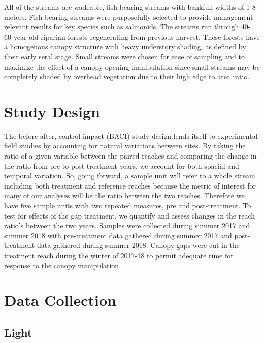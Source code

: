 \documentclass[double,12pt]{beavtex}
\begin{document}
  All of the streams are wadeable, fish-bearing streams with bankfull
  widths of 1-8 meters. Fish-bearing streams were purposefully selected to
  provide management-relevant results for key species such as salmonids.
  The streams run through 40-60-year-old riparian forests regenerating
  from previous harvest. These forests have a homogenous canopy structure
  with heavy understory shading, as defined by their early seral stage.
  Small streams were chosen for ease of sampling and to maximize the
  effect of a canopy opening manipulation since small streams may be
  completely shaded by overhead vegetation due to their high edge to area
  ratio.
  
  \section*{Study Design}\label{study-design}
  
  The before-after, control-impact (BACI) study design lends itself to
  experimental field studies by accounting for natural variations between
  sites. By taking the ratio of a given variable between the paired
  reaches and comparing the change in the ratio from pre to post-treatment
  years, we account for both spacial and temporal variation. So, going
  forward, a sample unit will refer to a whole stream including both
  treatment and reference reaches because the metric of interest for many
  of our analyses will be the ratio between the two reaches. Therefore we
  have five sample units with two repeated measures, pre and
  post-treatment. To test for effects of the gap treatment, we quantify
  and assess changes in the reach ratio's between the two years. Samples
  were collected during summer 2017 and summer 2018 with pre-treatment
  data gathered during summer 2017 and post-treatment data gathered during
  summer 2018. Canopy gaps were cut in the treatment reach during the
  winter of 2017-18 to permit adequate time for response to the canopy
  manipulation.
  
  \section*{Data Collection}\label{data-collection}
  
  \subsection*{Light}\label{light}
  
\end{document}
